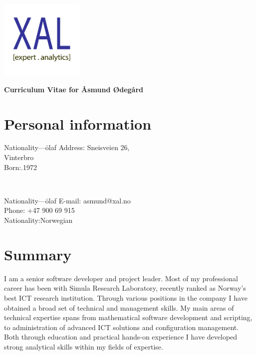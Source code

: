 \documentclass[english,a4paper,11pt]{article}
\begin{document}
\vspace*{-3cm}
\hspace*{12.5cm}\includegraphics[width=4cm]{logo.pdf}

\vspace*{-1.65cm}

\noindent
{\LARGE \bfseries \color{xaldark}Curriculum Vitae for Åsmund Ødegård}

\section*{Personal information}

\begin{minipage}[t]{0.4\textwidth}
\begin{tabbing}Nationality---\=olaf\kill 
Address: \>Sneisveien 26, \\
 Vinterbro \\
Born:.1972 \\
\end{tabbing}
\end{minipage}
$\quad\quad$
\begin{minipage}[t]{0.3\textwidth}
\begin{tabbing}Nationality---\=olaf\kill 
E-mail: \>asmund@xal.no\\
Phone: \>+47 900 69 915\\
Nationality:\>Norwegian\\
\end{tabbing}
\end{minipage}

\section*{Summary}

I am a senior software developer and project leader. Most of my professional
career has been with Simula Research Laboratory, 
recently ranked as Norway's best ICT research institution. Through various
positions in the company I have obtained a broad set of technical and management
skills. My main areas of technical expertise spans from mathematical 
software development and scripting, to administration of advanced ICT
solutions and configuration management. Both through education and
practical hands-on experience I have developed strong analytical skills within
my fields of expertise. 
\end{document}
